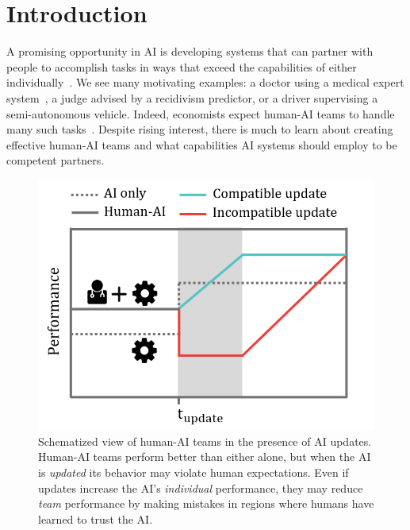 \documentclass[letterpaper]{article} %
\newcommand{\bug}
    {\mbox{\rule{2mm}{2mm}}}
\newcommand{\Bug}[1]
    {\bug \footnote{BUG: {#1}}}
\newcommand{\?}{\mbox{?}}
\begin{document}
\section{Introduction}

A promising opportunity in AI is developing systems that can partner with people to accomplish tasks in ways that exceed the capabilities of either individually~\cite{wang2016deep,kamar2016directions,gaur2016effects}.
We see many motivating examples: a doctor using a medical expert system~\cite{wang2016deep}, a judge advised by a recidivism predictor, or a driver supervising a semi-autonomous vehicle. Indeed, economists expect human-AI teams to handle many such tasks~\cite{forrester-17}. Despite rising interest, there is much to learn about creating effective human-AI teams and what capabilities AI systems should employ to be competent partners. 

\begin{figure}[t]
    \begin{center}
    \includegraphics[width=\linewidth]{Picture1v2.png}
    \end{center}
    \caption{Schematized view of human-AI teams in the presence of AI updates. Human-AI teams perform better than either alone, but when the AI is {\em updated} its behavior may violate human expectations. Even if updates increase the AI's {\em individual} performance, they may reduce {\em team} performance by making mistakes in regions where humans have learned to trust the AI.}
    \label{fig:landing}
\end{figure}
\end{document}
